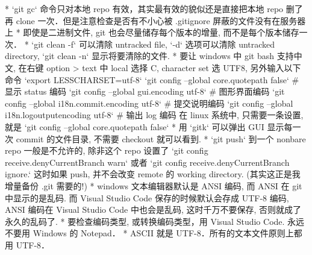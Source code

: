 * `git gc` 命令只对本地 repo 有效，其实最有效的貌似还是直接把本地 repo 删了再 clone 一次．但是注意检查是否有不小心被 .gitignore 屏蔽的文件没有在服务器上
* 即使是二进制文件, git 也会尽量储存每个版本的增量, 而不是每个版本储存一次．
* `git clean -f` 可以清除 untracked file, `-d` 选项可以清除 untracked directory,  `git clean -n` 显示将要清除的文件.
* 要让 windows 中 git bash 支持中文, 在右键 option > text 中 local 选择 C, character set 选 UTF8, 另外输入以下命令
`export LESSCHARSET=utf-8`
`git config --global core.quotepath false`          # 显示 status 编码
`git config --global gui.encoding utf-8`            # 图形界面编码
`git config --global i18n.commit.encoding utf-8`    # 提交说明编码
`git config --global i18n.logoutputencoding utf-8`  # 输出 log 编码
在 linux 系统中, 只需要一条设置, 就是
`git config --global core.quotepath false`
* 用 `gitk` 可以弹出 GUI 显示每一次 commit 的文件目录, 不需要 checkout 就可以看到.
* `git push` 到一个 nonbare repo 一般是不允许的, 除非这个 repo 设置了 `git config receive.denyCurrentBranch warn` 或者 `git config receive.denyCurrentBranch ignore.` 这时如果 push, 并不会改变 remote 的 working directory. (其实这正是我增量备份 .git 需要的!)
* windows 文本编辑器默认是 ANSI 编码, 而 ANSI 在 git 中显示的是乱码. 而 Visual Studio Code 保存的时候默认会存成 UTF-8 编码, ANSI 编码在 Visual Studio Code 中也会是乱码, 这时千万不要保存, 否则就成了永久的乱码了.
* 要检查编码类型, 或转换编码类型，用 Visual Studio Code. 永远不要用 Windows 的 Notepad．
* ASCII 就是 UTF-8．所有的文本文件原则上都用 UTF-8．

